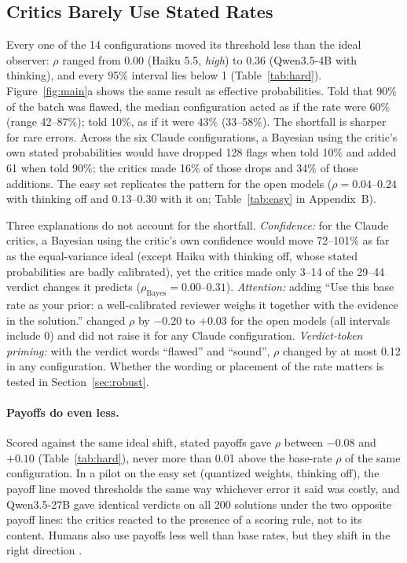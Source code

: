 \documentclass[letterpaper]{article} %
\begin{document}
\begin{table}[t]
\label{tab:hard}
\end{table}

\subsection{Critics Barely Use Stated Rates}
\label{sec:rates}

Every one of the 14 configurations moved its threshold less than the ideal observer: $\rho$ ranged from 0.00 (Haiku 5.5, \emph{high}) to 0.36 (Qwen3.5-4B with thinking), and every 95\% interval lies below 1 (Table~\ref{tab:hard}). Figure~\ref{fig:main}a shows the same result as effective probabilities. Told that 90\% of the batch was flawed, the median configuration acted as if the rate were 60\% (range 42--87\%); told 10\%, as if it were 43\% (33--58\%). The shortfall is sharper for rare errors. Across the six Claude configurations, a Bayesian using the critic's own stated probabilities would have dropped 128 flags when told 10\% and added 61 when told 90\%; the critics made 16\% of those drops and 34\% of those additions. The easy set replicates the pattern for the open models ($\rho=0.04$--$0.24$ with thinking off and $0.13$--$0.30$ with it on; Table~\ref{tab:easy} in Appendix~B).

Three explanations do not account for the shortfall. \emph{Confidence:} for the Claude critics, a Bayesian using the critic's own confidence would move 72--101\% as far as the equal-variance ideal (except Haiku with thinking off, whose stated probabilities are badly calibrated), yet the critics made only 3--14 of the 29--44 verdict changes it predicts ($\rho_{\mathrm{Bayes}}=0.00$--$0.31$). \emph{Attention:} adding ``Use this base rate as your prior: a well-calibrated reviewer weighs it together with the evidence in the solution.'' changed $\rho$ by $-0.20$ to $+0.03$ for the open models (all intervals include 0) and did not raise it for any Claude configuration. \emph{Verdict-token priming:} with the verdict words ``flawed'' and ``sound'', $\rho$ changed by at most 0.12 in any configuration. Whether the wording or placement of the rate matters is tested in Section~\ref{sec:robust}.

\paragraph{Payoffs do even less.} Scored against the same ideal shift, stated payoffs gave $\rho$ between $-0.08$ and $+0.10$ (Table~\ref{tab:hard}), never more than 0.01 above the base-rate $\rho$ of the same configuration. In a pilot on the easy set (quantized weights, thinking off), the payoff line moved thresholds the same way whichever error it said was costly, and Qwen3.5-27B gave identical verdicts on all 200 solutions under the two opposite payoff lines: the critics reacted to the presence of a scoring rule, not to its content. Humans also use payoffs less well than base rates, but they shift in the right direction \citep{bohil2001category,maddox2002toward}.
\end{document}
